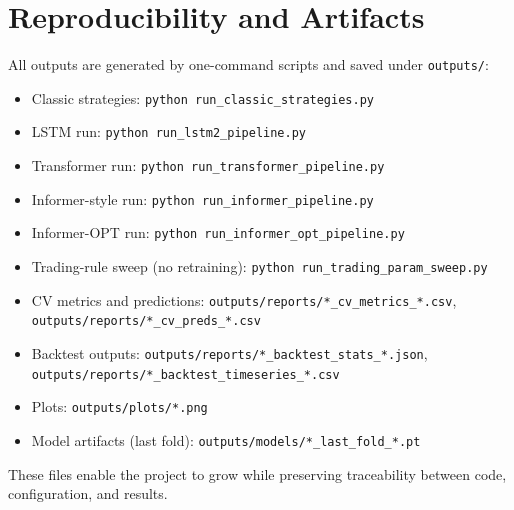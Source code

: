 \documentclass[letterpaper]{article} %
\begin{document}
\section{Reproducibility and Artifacts}
All outputs are generated by one-command scripts and saved under \texttt{outputs/}:
\begin{itemize}
  \item Classic strategies: \texttt{python run\_classic\_strategies.py}
  \item LSTM run: \texttt{python run\_lstm2\_pipeline.py}
  \item Transformer run: \texttt{python run\_transformer\_pipeline.py}
  \item Informer-style run: \texttt{python run\_informer\_pipeline.py}
  \item Informer-OPT run: \texttt{python run\_informer\_opt\_pipeline.py}
  \item Trading-rule sweep (no retraining): \texttt{python run\_trading\_param\_sweep.py}
  \item CV metrics and predictions: \texttt{outputs/reports/*\_cv\_metrics\_*.csv}, \texttt{outputs/reports/*\_cv\_preds\_*.csv}
  \item Backtest outputs: \texttt{outputs/reports/*\_backtest\_stats\_*.json}, \texttt{outputs/reports/*\_backtest\_timeseries\_*.csv}
  \item Plots: \texttt{outputs/plots/*.png}
  \item Model artifacts (last fold): \texttt{outputs/models/*\_last\_fold\_*.pt}
\end{itemize}
These files enable the project to grow while preserving traceability between code, configuration, and results.
\end{document}
